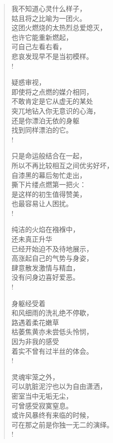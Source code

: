 \documentclass[UTF8, 12pt, a4paper]{ctexrep} %
\begin{document}
\begin{verse}

    我不知道心灵什么样子，\\
    姑且将之比喻为一团火。\\
    这团火燃烧的太热烈总爱熄灭，\\
    也许它能重新燃起，\\
    可自己左看右看，\\
    悲哀发现早不是当初模样。\\!
    
    疑惑审视，\\
    即使将之点燃的媒介相同，\\
    不敢肯定是它从虚无的某处\\
    突兀地钻入你无意识的心海，\\
    还是你漂泊无依的身躯\\
    找到同样漂泊的它。\\!
    
    只是命运般结合在一起，\\
    所以不再比较相互之间优劣好坏，\\
    自漆黑的幕后匆忙走出，\\
    撕下片缕点燃第一把火：\\
    是这样的初生值得赞美，\\
    也最容易让人困扰。\\!
    
    纯洁的火焰在襁褓中，\\
    还未真正升华\\
    已经开始迫不及待地展示，\\
    高涨起自己的气势与身姿，\\
    肆意散发激情与精血，\\
    没有问身边喜好爱恶。\\!
    
    身躯经受着\\
    和风细雨的洗礼绝不停歇，\\
    路遇着柔花嫩草\\
    枯萎焦黄亦未尝低头怜悯，\\
    因为非我的感受\\
    着实不曾有过半丝的体会。\\!
    
    灵魂牢笼之外，\\
    可以肮脏泥泞也以为自由潇洒，\\
    密室当中无垢无尘，\\
    可曾感受寂寞窒息。\\
    或许风暴终有来临的时候，\\
    可在那之前是你独一无二的演绎。\\!
    

\end{verse}
\end{document}
